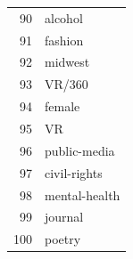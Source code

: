\documentclass[]{report}   %
\begin{document}
\begin{minipage}{0.24\textwidth}
\begin{tabular}{rl}
  90 & alcohol \\ 
  91 & fashion \\ 
  92 & midwest \\ 
  93 & VR/360 \\ 
  94 & female \\ 
  95 & VR \\ 
  96 & public-media \\ 
  97 & civil-rights \\ 
  98 & mental-health \\ 
  99 & journal \\ 
  100 & poetry \\ 
  \hline
\end{tabular}
    \end{minipage}
\begin{minipage}{0.24\textwidth}


\end{minipage}
\end{document}
